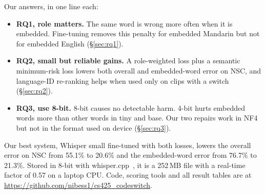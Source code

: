 \noindent Our answers, in one line each:
\begin{itemize}
  \item \textbf{RQ1, role matters.} The same word is wrong more often when it is embedded. Fine-tuning removes this penalty for embedded Mandarin but not for embedded English (\S\ref{sec:rq1}).
  \item \textbf{RQ2, small but reliable gains.} A role-weighted loss plus a semantic minimum-risk loss lowers both overall and embedded-word error on NSC, and language-ID re-ranking helps when used only on clips with a switch (\S\ref{sec:rq2}).
  \item \textbf{RQ3, use 8-bit.} 8-bit causes no detectable harm. 4-bit hurts embedded words more than other words in tiny and base. Our two repairs work in NF4 but not in the format used on device (\S\ref{sec:rq3}).
\end{itemize}

Our best system, Whisper small fine-tuned with both losses, lowers the overall error on NSC from 55.1\% to 20.6\% and the embedded-word error from 76.7\% to 21.3\%. Stored in 8-bit with whisper.cpp~\citep{whispercpp}, it is a 252\,MB file with a real-time factor of 0.57 on a laptop CPU. Code, scoring tools and all result tables are at \url{https://github.com/nibess1/cs425_codeswitch}.
